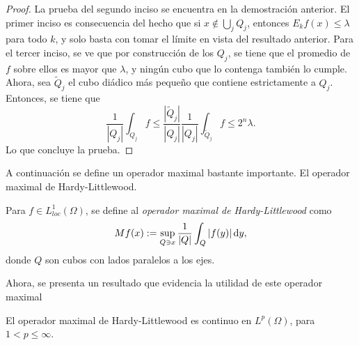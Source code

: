 \begin{proof}
	La prueba del segundo inciso se encuentra en la demostración anterior. El primer inciso es consecuencia del hecho que si $x\notin\bigcup_jQ_j$, entonces $E_kf(x) \leq \lambda$ para todo $k$, y solo basta con tomar el límite en vista del resultado anterior. Para el tercer inciso, se ve que  por construcción de los $Q_j$, se tiene que el promedio de $f$ sobre ellos es mayor que $\lambda$, y ningún cubo que lo contenga también lo cumple. Ahora, sea $\tilde{Q}_j$ el cubo diádico más pequeño que contiene estrictamente a $Q_j$. Entonces, se tiene que 
	\begin{equation*}
		\frac{1}{|Q_j|}\int_{Q_j} f \leq \frac{|\tilde{Q}_j|}{|Q_j|}\frac{1}{|Q_j|} \int_{\tilde{Q}_j} f \leq 2^n\lambda.
	\end{equation*}
	Lo que concluye la prueba.
\end{proof}
A continuación se define un operador maximal bastante importante. El operador maximal de Hardy-Littlewood.
\begin{definition}
	Para $f\in L^1_{loc}(\Omega)$, se define al \textit{operador maximal de Hardy-Littlewood} como 
	\begin{equation*}
		Mf(x) := \sup_{Q\ni x} \frac{1}{|Q|}\int_Q |f(y)|\mathop{}\!\mathrm{d} y,
	\end{equation*}
	donde $Q$ son cubos con lados paralelos a los ejes.
\end{definition}
Ahora, se presenta un resultado que evidencia la utilidad de este operador maximal
\begin{theorem}\label{theo:Hardy-Littlewood}
	El operador maximal de Hardy-Littlewood es continuo en $L^p(\Omega)$, para $1<p\leq\infty$.
\end{theorem}
